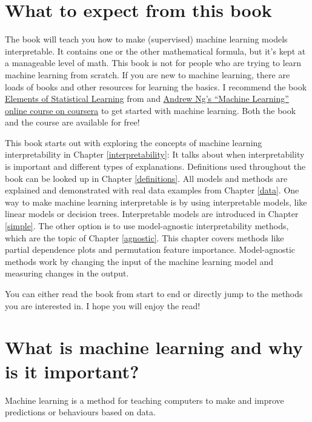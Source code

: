 \documentclass[12pt,]{krantz}
\theoremstyle{definition}
\theoremstyle{definition}
\theoremstyle{definition}
\theoremstyle{remark}
\begin{document}
\section{What to expect from this
book}\label{what-to-expect-from-this-book}

The book will teach you how to make (supervised) machine learning models
interpretable. It contains one or the other mathematical formula, but
it's kept at a manageable level of math. This book is not for people who
are trying to learn machine learning from scratch. If you are new to
machine learning, there are loads of books and other resources for
learning the basics. I recommend the book
\href{https://web.stanford.edu/~hastie/ElemStatLearn/}{Elements of
Statistical Learning} from \citet{Hastie2009} and
\href{https://www.coursera.org/learn/machine-learning}{Andrew Ng's
``Machine Learning'' online course on coursera} to get started with
machine learning. Both the book and the course are available for free!

This book starts out with exploring the concepts of machine learning
interpretability in Chapter \ref{interpretability}: It talks about when
interpretability is important and different types of explanations.
Definitions used throughout the book can be looked up in Chapter
\ref{definitions}. All models and methods are explained and demonstrated
with real data examples from Chapter \ref{data}. One way to make machine
learning interpretable is by using interpretable models, like linear
models or decision trees. Interpretable models are introduced in Chapter
\ref{simple}. The other option is to use model-agnostic interpretability
methods, which are the topic of Chapter \ref{agnostic}. This chapter
covers methods like partial dependence plots and permutation feature
importance. Model-agnostic methods work by changing the input of the
machine learning model and measuring changes in the output.

You can either read the book from start to end or directly jump to the
methods you are interested in. I hope you will enjoy the read!

\section{What is machine learning and why is it
important?}\label{what-is-machine-learning-and-why-is-it-important}

Machine learning is a method for teaching computers to make and improve
predictions or behaviours based on data.
\end{document}

